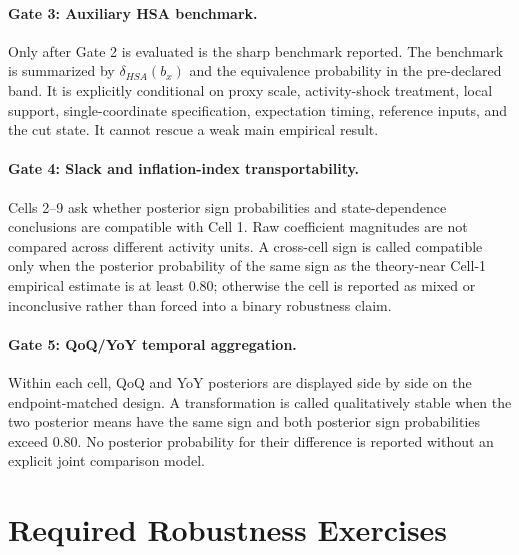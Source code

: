\documentclass[11pt]{article}
\begin{document}
\paragraph{Gate 3: Auxiliary HSA benchmark.}
Only after Gate 2 is evaluated is the sharp benchmark reported. The benchmark is summarized by $\delta_{HSA}(b_x)$ and the equivalence probability in the pre-declared band. It is explicitly conditional on proxy scale, activity-shock treatment, local support, single-coordinate specification, expectation timing, reference inputs, and the cut state. It cannot rescue a weak main empirical result.

\paragraph{Gate 4: Slack and inflation-index transportability.}
Cells 2--9 ask whether posterior sign probabilities and state-dependence conclusions are compatible with Cell 1. Raw coefficient magnitudes are not compared across different activity units. A cross-cell sign is called compatible only when the posterior probability of the same sign as the theory-near Cell-1 empirical estimate is at least $0.80$; otherwise the cell is reported as mixed or inconclusive rather than forced into a binary robustness claim.

\paragraph{Gate 5: QoQ/YoY temporal aggregation.}
Within each cell, QoQ and YoY posteriors are displayed side by side on the endpoint-matched design. A transformation is called qualitatively stable when the two posterior means have the same sign and both posterior sign probabilities exceed $0.80$. No posterior probability for their difference is reported without an explicit joint comparison model.

\section{Required Robustness Exercises}
\end{document}
